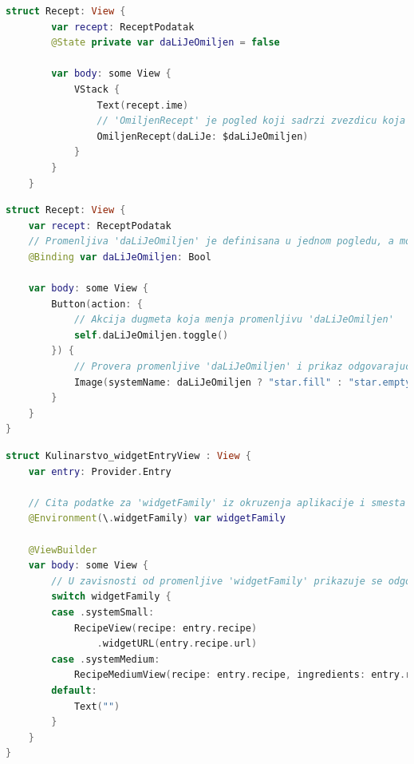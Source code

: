 \documentclass[12pt,oneside]{memoir}
\begin{document}
\begin{lstlisting}[caption=\textit{{Омотачи података --- State}}, label={lst:Омотачи података --- State}, language=Swift, frame=single]
    struct Recept: View {
        var recept: ReceptPodatak
        @State private var daLiJeOmiljen = false
        
        var body: some View {
            VStack {
                Text(recept.ime)
                // 'OmiljenRecept' je pogled koji sadrzi zvezdicu koja oznacava da li je recept medju omiljenima (puna zvezdica --- jeste, prazna --- nije)
                OmiljenRecept(daLiJe: $daLiJeOmiljen)
            }
        }
    }
\end{lstlisting}

\begin{lstlisting}[caption=\textit{{Омотачи података --- Binding}}, label={lst:Омотачи података --- Binding}, language=Swift, frame=single]
    struct Recept: View {
    var recept: ReceptPodatak
    // Promenljiva 'daLiJeOmiljen' je definisana u jednom pogledu, a moze se menjati u drugom
    @Binding var daLiJeOmiljen: Bool

    var body: some View {
        Button(action: {
            // Akcija dugmeta koja menja promenljivu 'daLiJeOmiljen'
            self.daLiJeOmiljen.toggle()
        }) {
            // Provera promenljive 'daLiJeOmiljen' i prikaz odgovarajuce slike
            Image(systemName: daLiJeOmiljen ? "star.fill" : "star.empty")
        }
    }
}
\end{lstlisting}

\begin{lstlisting}[caption=\textit{{Омотачи података --- Environment}}, label={lst:Омотачи података --- Environment}, language=Swift, frame=single]
    struct Kulinarstvo_widgetEntryView : View {
    var entry: Provider.Entry
    
    // Cita podatke za 'widgetFamily' iz okruzenja aplikacije i smesta ih u promenljivu 'widgetFamily'
    @Environment(\.widgetFamily) var widgetFamily
    
    @ViewBuilder
    var body: some View {
        // U zavisnosti od promenljive 'widgetFamily' prikazuje se odgovarajuci widget
        switch widgetFamily {
        case .systemSmall:
            RecipeView(recipe: entry.recipe)
                .widgetURL(entry.recipe.url)
        case .systemMedium:
            RecipeMediumView(recipe: entry.recipe, ingredients: entry.recipe.ingredients.count > 3 ? Array(entry.recipe.ingredients.dropLast(entry.recipe.ingredients.count - 3)) : entry.recipe.ingredients)
        default:
            Text("")
        }
    }
}
\end{lstlisting}
\end{document}

